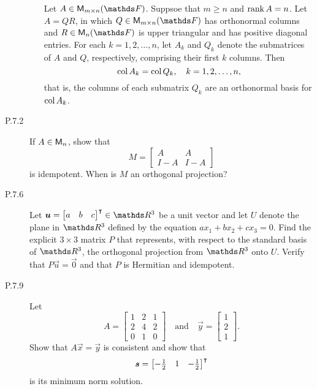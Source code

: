 \documentclass{../homework}
\begin{document}
\begin{description}
\begin{enumerate}
    \begin{bookcorollary}[6.5.15]
      Let \(A \in \M_{m \times n} (\FF)\).  Suppsoe that \(m \ge n\)
      and \(\operatorname{rank} A = n\).  Let \(A = QR\), in which
      \(Q \in \M_{m \times n} (\FF)\) has orthonormal columns and
      \(R \in \M_n (\FF)\) is upper triangular and has positive
      diagonal entries.  For each \(k = 1, 2, \dots, n\), let \(A_k\)
      and \(Q_k\) denote the submatrices of \(A\) and \(Q\),
      respectively, comprising their first \(k\) columns.  Then
      \[
        \operatorname{col} A_k = \operatorname{col} Q_k, \quad k = 1, 2, \dots, n,
      \]
      that is, the columns of each submatrix \(Q_k\) are an
      orthonormal basis for \(\operatorname{col} A_k\).
    \end{bookcorollary}

    \begin{solution}

    \end{solution}
  \end{enumerate}

\item[P.7.2] If \(A \in \mathsf{M}_n\), show that
  \[
    M =
    \begin{bmatrix}
      A   & A \\
      I-A & I-A
    \end{bmatrix}
  \]
  is idempotent.  When is \(M\) an orthogonal projection?

\item[P.7.6] Let
  \(\vec u = \begin{bmatrix} a & b & c \end{bmatrix}^\transpose \in
  \RR^3\) be a unit vector and let \(U\) denote the plane in \(\RR^3\)
  defined by the equation \(a x_1 + b x_2 + c x_3 = 0\).  Find the
  explicit \(3 \times 3\) matrix \(P\) that represents, with respect
  to the standard basis of \(\RR^3\), the orthogonal projection from
  \(\RR^3\) onto \(U\).  Verify that \(P \vec u = \vec 0\) and that
  \(P\) is Hermitian and idempotent.

  \begin{solution}

  \end{solution}

\item[P.7.9] Let
  \[
    A =
    \begin{bmatrix}
      1 & 2 & 1 \\
      2 & 4 & 2 \\
      0 & 1 & 0
    \end{bmatrix}
    \quad \text{and} \quad
    \vec y =
    \begin{bmatrix}
      1 \\ 2 \\ 1
    \end{bmatrix}.
  \]
  Show that \(A \vec x = \vec y\) is consistent and show that
  \[
    \vec s =
    \begin{bmatrix}
      -\frac 1 2 & 1 & -\frac 1 2
    \end{bmatrix}^\transpose
  \]
  is its minimum norm solution.


\end{description}
\end{document}
